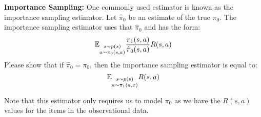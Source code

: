 \item  {} \textbf{Importance Sampling:}  One commonly used estimator is known as the importance sampling estimator. Let $\hat{\pi}_0$ be an estimate of the true $\pi_0$. The importance sampling estimator uses that $\hat{\pi}_0$ and has the form: $$\mathbb{E}_{\substack{s\sim p(s) \\ a \sim \pi_0(s, a)}} \frac{\pi_1(s, a)}{\hat{\pi}_0(s, a)}  R(s, a)$$ Please show that if $\hat{\pi}_0 = \pi_0$, then the importance sampling estimator is equal to: 
$$\mathbb{E}_{\substack{s\sim p(s) \\ a \sim \pi_1(a, x)}} R(s, a)$$

  Note that this estimator only requires us to model $\pi_0$ as we have the $R(s, a)$ values for the items in the observational data.
